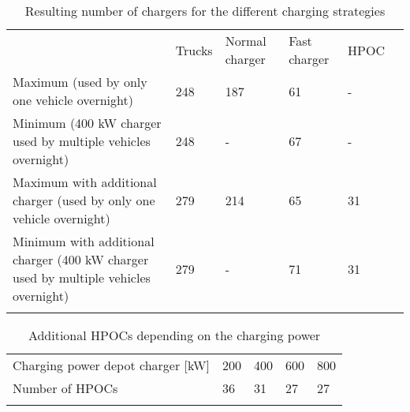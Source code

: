 \documentclass[3p,times,procedia]{elsarticle}
\begin{document}

\begin{table}[ht]
\caption{Resulting number of chargers for the different charging strategies}
\begin{tabular*}{\hsize}{@{\extracolsep{\fill}}llllll@{}}
\toprule
 & Trucks  & Normal charger & Fast charger & HPOC\\
\colrule
Maximum (used by only one vehicle overnight) &  248   &  187  &  61  &  -\\
Minimum (400 kW charger used by multiple vehicles overnight)  &  248   &  -  &  67  &  -\\
Maximum with additional charger (used by only one vehicle overnight) &  279   &  214  &  65  &  31\\
Minimum with additional charger (400 kW charger used by multiple vehicles overnight)  &  279   &  -  &  71  &  31\\
\botrule
\label{tab:final_amount}
\end{tabular*}
\end{table}

\begin{table}[ht]
\caption{Additional HPOCs depending on the charging power}
\begin{tabular*}{\hsize}{@{\extracolsep{\fill}}lllll@{}}
\toprule
Charging power depot charger [kW] & 200 & 400 & 600 & 800 \\
Number of HPOCs & 36 & 31 & 27 & 27 \\
\botrule
\label{tab:additional_amount}
\end{tabular*}
\end{table}
\end{document}
